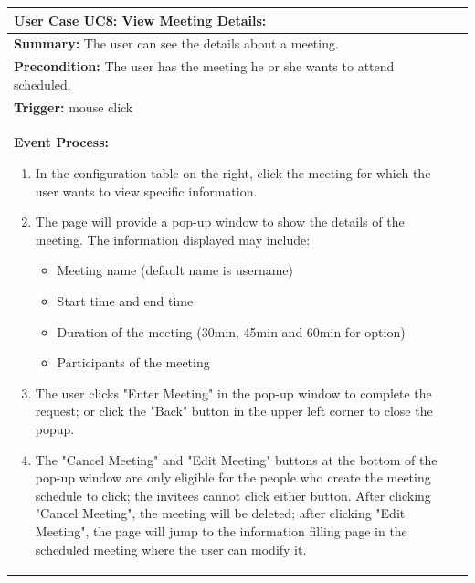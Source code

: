 \documentclass{article}
\begin{document}
  \begin{tabularx}{0.9\textwidth} { 
    | >{\raggedright\arraybackslash}X 
    | >{\centering\arraybackslash}X | }
   \hline
   \textbf{User Case UC8: View Meeting Details:} \\
   \hline
   \textbf{Summary:} The user can see the details about a meeting.\\
   \hline
   \textbf{Precondition:} The user has the meeting he or she wants to attend scheduled.\\
   \hline
   \textbf{Trigger:} mouse click\\
   \hline
   \textbf{Event Process:}
   \begin{enumerate}
    \item In the configuration table on the right, click the meeting for which the user wants to view specific information.
    \item The page will provide a pop-up window to show the details of the meeting. The information displayed may include:
    \begin{itemize}
        \item Meeting name (default name is username)
        \item Start time and end time
        \item Duration of the meeting (30min, 45min and 60min for option)
        \item Participants of the meeting
    \end{itemize}
    \item The user clicks "Enter Meeting" in the pop-up window to complete the request; or click the "Back" button in the upper left corner to close the popup.
    \item The "Cancel Meeting" and "Edit Meeting" buttons at the bottom of the pop-up window are only eligible for the people who create the meeting schedule to click; the invitees cannot click either button. After clicking "Cancel Meeting", the meeting will be deleted; after clicking "Edit Meeting", the page will jump to the information filling page in the scheduled meeting where the user can modify it.
   \end{enumerate}\\
   \hline
  \end{tabularx}
\end{document}
